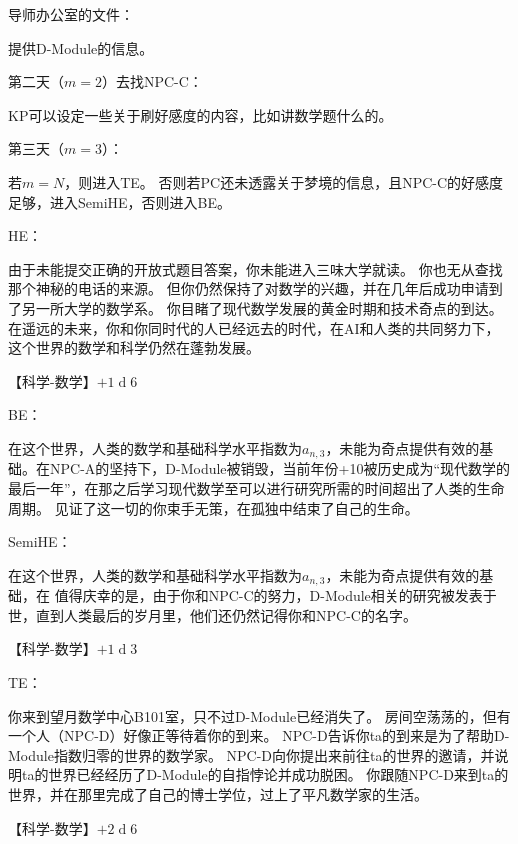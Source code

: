 \documentclass[12pt]{report}
\begin{document}
\color{green}
导师办公室的文件：

\color{red}
提供D-Module的信息。

\color{green}
第二天（$m=2$）去找NPC-C：

\color{red}
KP可以设定一些关于刷好感度的内容，比如讲数学题什么的。

\color{green}
第三天（$m=3$）：

\color{black}
若$m=N$，则进入TE。
否则若PC还未透露关于梦境的信息，且NPC-C的好感度足够，进入SemiHE，否则进入BE。

\color{green}
HE：

\color{black}
由于未能提交正确的开放式题目答案，你未能进入三味大学就读。
你也无从查找那个神秘的电话的来源。
但你仍然保持了对数学的兴趣，并在几年后成功申请到了另一所大学的数学系。
你目睹了现代数学发展的黄金时期和技术奇点的到达。
在遥远的未来，你和你同时代的人已经远去的时代，在AI和人类的共同努力下，这个世界的数学和科学仍然在蓬勃发展。

\color{purple}【科学-数学】$+1\operatorname{d}6$

\color{green}
BE：

\color{black}
在这个世界，人类的数学和基础科学水平指数为$a_{n,3}$，未能为奇点提供有效的基础。在NPC-A的坚持下，D-Module被销毁，{当前年份+10}被历史成为“现代数学的最后一年”，在那之后学习现代数学至可以进行研究所需的时间超出了人类的生命周期。
见证了这一切的你束手无策，在孤独中结束了自己的生命。

\color{green}
SemiHE：

\color{black}
在这个世界，人类的数学和基础科学水平指数为$a_{n,3}$，未能为奇点提供有效的基础，在
值得庆幸的是，由于你和NPC-C的努力，D-Module相关的研究被发表于世，直到人类最后的岁月里，他们还仍然记得你和NPC-C的名字。

\color{purple}【科学-数学】$+1\operatorname{d}3$

\color{green}
TE：

\color{black}
你来到望月数学中心B101室，只不过D-Module已经消失了。
房间空荡荡的，但有一个人（NPC-D）好像正等待着你的到来。
NPC-D告诉你ta的到来是为了帮助D-Module指数归零的世界的数学家。
NPC-D向你提出来前往ta的世界的邀请，并说明ta的世界已经经历了D-Module的自指悖论并成功脱困。
你跟随NPC-D来到ta的世界，并在那里完成了自己的博士学位，过上了平凡数学家的生活。

\color{purple}【科学-数学】$+2\operatorname{d}6$
\end{document}
